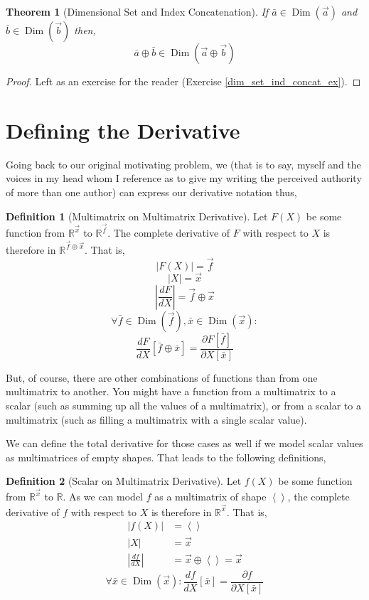 \documentclass[12pt]{book}
\theoremstyle{plain}
\newtheorem{theorem}{Theorem}[chapter]
\theoremstyle{definition}
\newtheorem{definition}{Definition}[chapter]
\theoremstyle{ppart}
\theoremstyle{case}
\theoremstyle{solution}
\DeclareMathOperator{\Dim}{Dim}
\newcommand{\shape}[1]{\left|#1\right|}
\begin{document}
\begin{theorem}[Dimensional Set and Index Concatenation]
\label{dim_set_ind_concat_thm}
If $\bar{a} \in \Dim(\vec{a})$ and $\bar{b} \in \Dim(\vec{b})$ then,
\[ \bar{a} \oplus \bar{b} \in \Dim(\vec{a} \oplus \vec{b}) \]
\end{theorem}
\begin{proof}
Left as an exercise for the reader (Exercise \ref{dim_set_ind_concat_ex}).
\end{proof}

\section{Defining the Derivative}

Going back to our original motivating problem, we (that is to say, myself and the voices
in my head whom I reference as to give my writing the perceived authority
of more than one author) can express our derivative notation thus,

\begin{definition}[Multimatrix on Multimatrix Derivative]
\label{mm_derivative}
Let $F(X)$ be some function from $\mathbb{R}^{\vec{x}}$ to $\mathbb{R}^{\vec{f}}$.
The complete derivative of $F$ with respect to $X$ is therefore in
$\mathbb{R}^{\vec{f} \oplus \vec{x}}$. That is,
\[ \shape{F(X)} = \vec{f} \]
\[ \shape{X} = \vec{x} \]
\[ \shape{\frac{dF}{dX}} = \vec{f} \oplus \vec{x} \]
\[
\forall \bar{f} \in \Dim(\vec{f}),
        \bar{x} \in \Dim(\vec{x}):
\]
\[
\frac{dF}{dX}[\bar{f} \oplus \bar{x}] =
\frac{\partial F[\bar{f}]}{\partial X[\bar{x}]}
\]
\end{definition}

But, of course, there are other combinations of functions than from one
multimatrix to another. You might have a function from a multimatrix to a
scalar (such as summing up all the values of a multimatrix), or from a scalar
to a multimatrix (such as filling a multimatrix with a single scalar value).

We can define the total derivative for those cases as well if we model scalar
values as multimatrices of empty shapes. That leads to the following definitions,

\begin{definition}[Scalar on Multimatrix Derivative]
\label{sm_derivative}
Let $f(X)$ be some function from $\mathbb{R}^{\vec{x}}$ to $\mathbb{R}$.
As we can model $f$ as a multimatrix of shape $\left<\right>$,
the complete derivative of $f$ with respect to $X$ is therefore in
$\mathbb{R}^{\vec{x}}$. That is,
\begin{align*}
\shape{f(X)} &= \left<\right> \\
\shape{X} &= \vec{x} \\
\shape{\frac{df}{dX}} &= \vec{x} \oplus \left<\right> = \vec{x}
\end{align*}
\[
\forall \bar{x} \in \Dim(\vec{x}):
        \frac{df}{dX}[\bar{x}] =
        \frac{\partial f}{\partial X[\bar{x}]}
\]
\end{definition}
\end{document}
